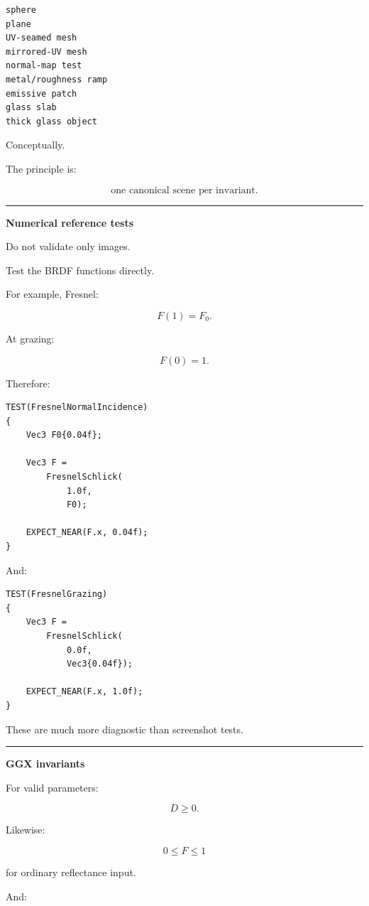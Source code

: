\begin{verbatim}
sphere
plane
UV-seamed mesh
mirrored-UV mesh
normal-map test
metal/roughness ramp
emissive patch
glass slab
thick glass object
\end{verbatim}

Conceptually.

The principle is:

\[
\boxed{
\text{one canonical scene per invariant}.
}
\]

\begin{center}\rule{0.5\linewidth}{0.5pt}\end{center}

\textbf{Numerical reference tests}

Do not validate only images.

Test the BRDF functions directly.

For example, Fresnel:

\[
F(1)=F_0.
\]

At grazing:

\[
F(0)=1.
\]

Therefore:

\begin{verbatim}
TEST(FresnelNormalIncidence)
{
    Vec3 F0{0.04f};

    Vec3 F =
        FresnelSchlick(
            1.0f,
            F0);

    EXPECT_NEAR(F.x, 0.04f);
}
\end{verbatim}

And:

\begin{verbatim}
TEST(FresnelGrazing)
{
    Vec3 F =
        FresnelSchlick(
            0.0f,
            Vec3{0.04f});

    EXPECT_NEAR(F.x, 1.0f);
}
\end{verbatim}

These are much more diagnostic than screenshot tests.

\begin{center}\rule{0.5\linewidth}{0.5pt}\end{center}

\textbf{GGX invariants}

For valid parameters:

\[
D\ge0.
\]

Likewise:

\[
0\le F\le1
\]

for ordinary reflectance input.

And:

